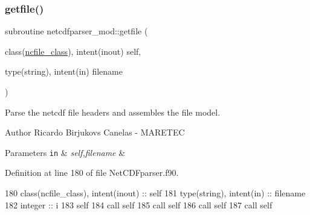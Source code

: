 \subsubsection{\texorpdfstring{getfile()}{getfile()}}
{\footnotesize\ttfamily subroutine netcdfparser\+\_\+mod\+::getfile (\begin{DoxyParamCaption}\item[{class(\mbox{\hyperlink{structnetcdfparser__mod_1_1ncfile__class}{ncfile\+\_\+class}}), intent(inout)}]{self,  }\item[{type(string), intent(in)}]{filename }\end{DoxyParamCaption})\hspace{0.3cm}{\ttfamily [private]}}



Parse the netcdf file headers and assembles the file model. 

\begin{DoxyAuthor}{Author}
Ricardo Birjukovs Canelas -\/ M\+A\+R\+E\+T\+EC 
\end{DoxyAuthor}

\begin{DoxyParams}[1]{Parameters}
\mbox{\tt in}  & {\em self,filename} & \\
\hline
\end{DoxyParams}


Definition at line 180 of file Net\+C\+D\+Fparser.\+f90.


\begin{DoxyCode}
180     \textcolor{keywordtype}{class}(ncfile\_class), \textcolor{keywordtype}{intent(inout)} :: self
181     \textcolor{keywordtype}{type}(string), \textcolor{keywordtype}{intent(in)} :: filename
182     \textcolor{keywordtype}{integer} :: i
183     self%
184     \textcolor{keyword}{call }self%
185     \textcolor{keyword}{call }self%
186     \textcolor{keyword}{call }self%
187     \textcolor{keyword}{call }self%
\end{DoxyCode}
\mbox{\label{namespacenetcdfparser__mod_ada78b9f33d39c4763f412f004524cbea}} 
